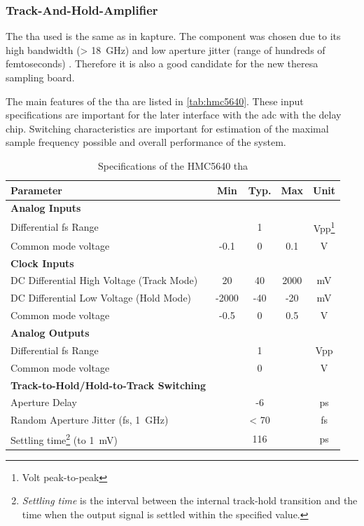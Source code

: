 \subsubsection*{Track-And-Hold-Amplifier}
The \gls{tha} used is the same as in \gls{kapture}. 
The component was chosen due to its high bandwidth (> \SI{18}{\GHz}) and low aperture jitter (range of hundreds of femtoseconds) \cite{caselle2013} . 
Therefore it is also a good candidate for the new \gls{theresa} sampling board.


The main features of the \gls{tha} are listed in \autoref{tab:hmc5640}.
These input specifications are important for the later interface with the \gls{adc} with the delay chip.
Switching characteristics are important for estimation of the maximal sample frequency possible and overall performance of the system.
\begin{table}[tbh]
	\caption[HMC5640 Characteristics]{Specifications of the HMC5640 \gls{tha}}
	\label{tab:hmc5640}
	\begin{minipage}{\textwidth}
		\centering
		\begin{tabularx}{\textwidth}{Xcccc}
			\toprule
			\textbf{Parameter} & \textbf{Min} & \textbf{Typ.} & \textbf{Max} & \textbf{Unit}\\
			\midrule
			\textbf{Analog Inputs} &&&& \\
			Differential \gls{fs} Range & & 1 & & Vpp\footnote{Volt peak-to-peak}\\
			Common mode voltage & -0.1 & 0 & 0.1 & V\\[0.3cm]
			\textbf{Clock Inputs} &&&&\\
			DC Differential High Voltage (Track Mode) & 20 & 40 & 2000 & mV\\
			DC Differential Low Voltage (Hold Mode) & -2000 & -40 & -20 & mV\\
			Common mode voltage & -0.5 & 0 & 0.5 & V\\[0.3cm]
			\textbf{Analog Outputs} &&&&\\
			Differential \gls{fs} Range &  & 1 && Vpp\\
			Common mode voltage & & 0 & & V\\[0.3cm]
			\textbf{Track-to-Hold/Hold-to-Track Switching} &&&&\\
			Aperture Delay & & -6 &  & ps\\
			Random Aperture Jitter (\gls{fs}, \SI{1}{\giga \hertz}) & & < 70 & & fs\\
			Settling time\footnote{\textit{Settling time} is the interval between the internal track-hold transition and the time when the output signal is settled within the specified value.} (to \SI{1}{\milli \volt}) &	&  116 & & ps \\
			\bottomrule
		\end{tabularx}
	\end{minipage}
\end{table}

